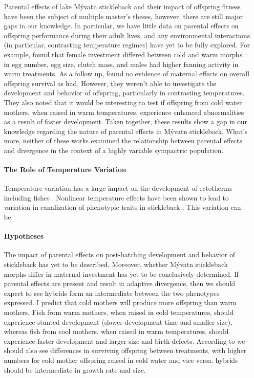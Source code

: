 \documentclass[12pt]{extarticle}
\begin{document}
Parental effects of lake M\'yvatn stickleback and their impact of offspring fitness have been the subject of multiple master's theses, however, there are still major gaps in our knowledge. In particular, we have little data on parental effects on offspring performance during their adult lives, and any environmental interactions (in particular, contrasting temperature regimes) have yet to be fully explored. For example, \citet{Senn} found that female investment differed between cold and warm morphs in egg number, egg size, clutch mass, and males had higher fanning activity in warm treatments. As a follow up, \citet{Diethelm} found no evidence of maternal effects on overall offspring survival as \citet{Senn} had. However, they weren't able to investigate the development and behavior of offspring, particularly in contrasting temperatures. They also noted that it would be interesting to test if offspring from cold water mothers, when raised in warm temperatures, experience enhanced abnormalities as a result of faster development. Taken together, these results show a gap in our knowledge regarding the nature of parental effects in M\'yvatn stickleback. What's more, neither of these works examined the relationship between parental effects and divergence in the context of a highly variable sympactric population.

\paragraph{The Role of Temperature Variation}
Temperature variation has a large impact on the development of ectotherms including fishes \citep{Massey2021}. Nonlinear temperature effects have been shown to lead to variation in canalization of phenotypic traits in stickleback \citep{Ramler2014}. This variation can be

\paragraph{Hypotheses}
The impact of parental effects on post-hatching development and behavior of stickleback has yet to be described. Moreover, whether M\'yvatn stickleback morphs differ in maternal investment has yet to be conclusively determined. 
If parental effects are present and result in adaptive divergence, then we should expect to see hybrids form an intermediate between the two phenotypes expressed. I predict that cold mothers will produce more offspring than warm mothers. Fish from warm mothers, when raised in cold temperatures, should experience stunted development (slower development time and smaller size), whereas fish from cool mothers, when raised in warm temperatures, should experience faster development and larger size and birth defects.
According to \citet{Senn} we should also see differences in surviving offspring between treatments, with higher numbers for cold mother offspring raised in cold water and vice versa. hybrids should be intermediate in growth rate and size.
\end{document}
